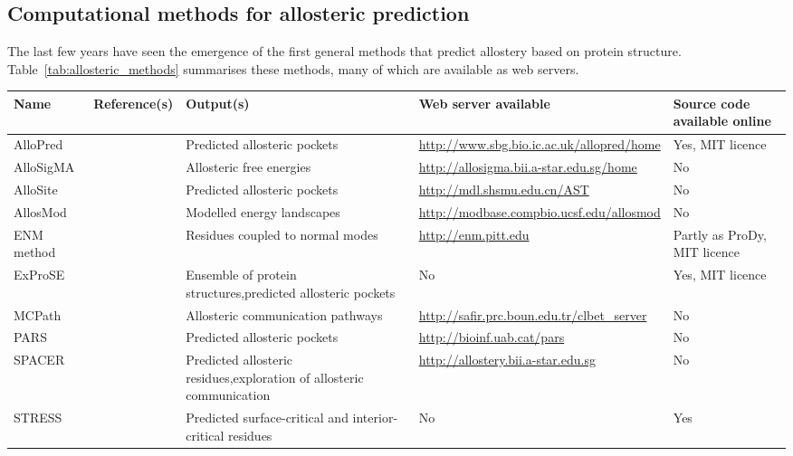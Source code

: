 \subsection{Computational methods for allosteric prediction}

The last few years have seen the emergence of the first general methods that predict allostery based on protein structure.
Table~\ref{tab:allosteric_methods} summarises these methods, many of which are available as web servers.


\begin{table}
\centering

\begin{footnotesize}
\begin{tabular}{ l l p{5cm} l l }
\hline
Name & Reference(s) & Output(s) & Web server available & Source code available online \\
\hline
AlloPred & \cite{Greener2015} & Predicted allosteric pockets & \url{http://www.sbg.bio.ic.ac.uk/allopred/home} & Yes, MIT licence \\
AlloSigMA & \cite{Guarnera2017} & Allosteric free energies & \url{http://allosigma.bii.a-star.edu.sg/home} & No \\
AlloSite & \cite{Huang2013} & Predicted allosteric pockets & \url{http://mdl.shsmu.edu.cn/AST} & No \\ %
AllosMod & \cite{Weinkam2012} & Modelled energy landscapes & \url{http://modbase.compbio.ucsf.edu/allosmod} & No \\
ENM method & \cite{Li2017} & Residues coupled to normal modes & \url{http://enm.pitt.edu} & Partly as ProDy, MIT licence \\
ExProSE & \cite{Greener2017} & Ensemble of protein structures,\newline predicted allosteric pockets & No & Yes, MIT licence \\
MCPath & \cite{Kaya2013} & Allosteric communication pathways & \url{http://safir.prc.boun.edu.tr/clbet_server} & No \\
PARS & \cite{Panjkovich2014, Panjkovich2012} & Predicted allosteric pockets & \url{http://bioinf.uab.cat/pars} & No \\
SPACER & \cite{Goncearenco2013, Mitternacht2011} & Predicted allosteric residues,\newline exploration of allosteric communication & \url{http://allostery.bii.a-star.edu.sg} & No \\ %
STRESS & \cite{Clarke2016} & Predicted surface-critical and interior-critical residues & No & Yes \\ %
\hline
\end{tabular}
\end{footnotesize}


\end{table}
